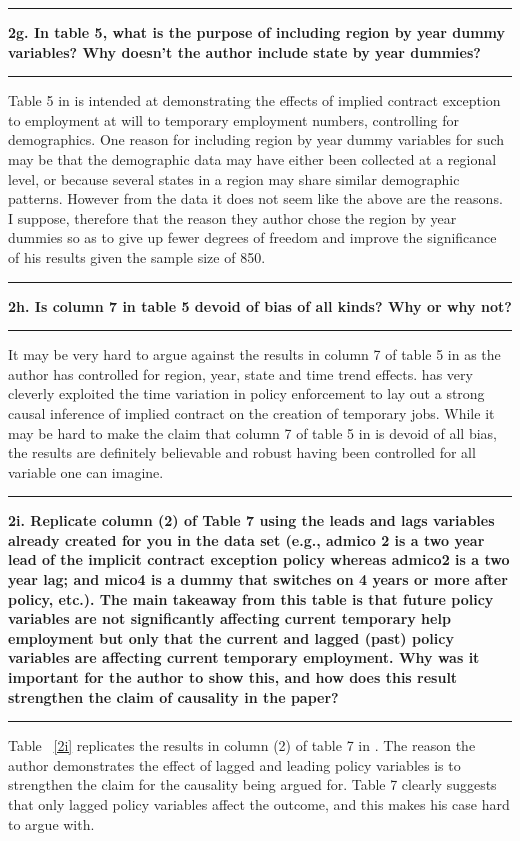 \documentclass[12pt]{article}
\newcommand\question[1]{\vspace{1em}\hrule\vspace{1em}\textbf{#1}\vspace{1em}\hrule\vspace{1em}}
\begin{document}
\newpage
\question{2g. In table 5, what is the purpose of including region by year dummy variables? Why doesn't the author include state by year dummies? }
\noindent Table 5 in \cite{Autor2003} is intended at demonstrating the effects of implied contract exception to employment at will to temporary employment numbers, controlling for demographics. One reason for including region by year dummy variables for such may be that the demographic data may have either been collected at a regional level, or because several states in a region may share similar demographic patterns.  However from the data it does not seem like the above are the reasons. I suppose, therefore that the reason they author chose the region by year dummies so as to give up fewer degrees of freedom and improve the significance of his results given the sample size of 850.

\newpage
\question{2h. Is column 7 in table 5 devoid of bias of all kinds? Why or why not? }
\noindent It may be very hard to argue against the results in column 7 of table 5 in \cite{Autor2003} as the author has controlled for region, year, state and time trend effects. \cite{Autor2003} has very cleverly exploited the time variation in policy enforcement to lay out  a strong causal inference of implied contract on the creation of temporary jobs. While it may be hard to make the claim that column 7 of table 5 in \cite{Autor2003} is devoid of all bias, the results are definitely believable and robust having been controlled for all variable one can imagine.

\newpage
\question{2i. Replicate column (2) of Table 7 using the leads and lags variables already created for you in the data set (e.g., admico 2 is a two year lead of the implicit contract exception policy whereas admico2 is a two year lag; and mico4 is a dummy that switches on 4 years or more after policy, etc.). The main takeaway from this table is that future policy variables are not significantly affecting current temporary help employment but only that the current and lagged (past) policy variables are affecting current temporary employment. Why was it important for the author to show this, and how does this result strengthen the claim of causality in the paper?}

\noindent Table ~\ref{2i} replicates the results in column (2) of table 7 in \cite{Autor2003}.  The reason the author demonstrates the effect of lagged and leading policy variables is to strengthen the claim for the causality being argued for. Table 7 clearly suggests that only lagged policy variables affect the outcome, and this makes his case hard to argue with.\\
\end{document}
